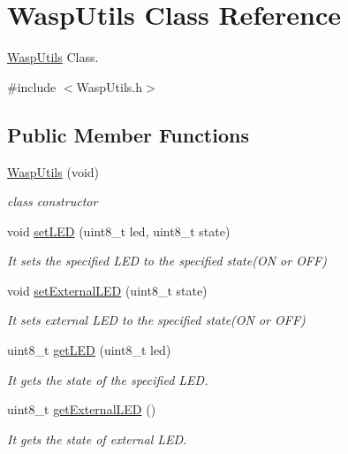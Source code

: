 \hypertarget{class_wasp_utils}{}\section{Wasp\+Utils Class Reference}
\label{class_wasp_utils}


\hyperlink{class_wasp_utils}{Wasp\+Utils} Class.  




{\ttfamily \#include $<$Wasp\+Utils.\+h$>$}

\subsection*{Public Member Functions}
\begin{DoxyCompactItemize}
\item 
\hyperlink{class_wasp_utils_a5c4ffc3263d0e59dfcbb934554ea6d18}{Wasp\+Utils} (void)
\begin{DoxyCompactList}\small\item\em class constructor \end{DoxyCompactList}\item 
void \hyperlink{class_wasp_utils_ad898a15ea8af795b5262d7d7a4a2cb28}{set\+L\+ED} (uint8\+\_\+t led, uint8\+\_\+t state)
\begin{DoxyCompactList}\small\item\em It sets the specified L\+ED to the specified state(\+O\+N or O\+F\+F) \end{DoxyCompactList}\item 
void \hyperlink{class_wasp_utils_a84789aadda2bbb85b700682f87b5c2e0}{set\+External\+L\+ED} (uint8\+\_\+t state)
\begin{DoxyCompactList}\small\item\em It sets external L\+ED to the specified state(\+O\+N or O\+F\+F) \end{DoxyCompactList}\item 
uint8\+\_\+t \hyperlink{class_wasp_utils_a7915f329e7b98e74426d16cd3f1d9914}{get\+L\+ED} (uint8\+\_\+t led)
\begin{DoxyCompactList}\small\item\em It gets the state of the specified L\+ED. \end{DoxyCompactList}\item 
uint8\+\_\+t \hyperlink{class_wasp_utils_ac5f31b1868a6a1009e5a021bb754a7b3}{get\+External\+L\+ED} ()
\begin{DoxyCompactList}\small\item\em It gets the state of external L\+ED. \end{DoxyCompactList}\item 

\end{DoxyCompactItemize}
